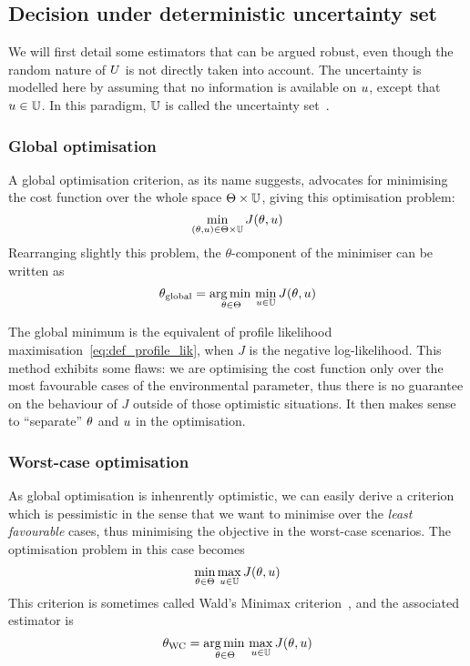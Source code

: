 \documentclass[../../Main_ManuscritThese.tex]{subfiles}
\begin{document}
\subsection{Decision under deterministic uncertainty set}
We will first detail some estimators that can be argued robust, even though the random nature of $U$ is not directly taken into account.
The uncertainty is modelled here by assuming that no information is available on $u$, except that $u \in \mathbb{U}$. In this paradigm, $\mathbb{U}$ is called the uncertainty set~\citep{bertsimas_theory_2010}.

\subsubsection{Global optimisation}
A global optimisation criterion, as its name suggests, advocates for minimising the cost function over the whole space $\Theta \times \mathbb{U}$, giving this optimisation problem:
\begin{equation}
  \min_{(\theta,u) \in \Theta \times \mathbb{U}} J(\theta, u)
\end{equation}
Rearranging slightly this problem, the $\theta$-component of the minimiser can be written as
\begin{equation}
  \label{eq:kkglobal}
  {\theta}_{\mathrm{global}} = \operatorname*{arg\,min \,}_{\theta \in \Theta} \min_{u \in \mathbb{U}} J(\theta, u)
\end{equation}

The global minimum is the equivalent of profile likelihood
maximisation~\cref{eq:def_profile_lik}, when $J$ is the negative
log-likelihood. This method exhibits some flaws: we are optimising the
cost function only over the most favourable cases of the environmental
parameter, thus there is no guarantee on the behaviour of $J$ outside
of those optimistic situations.  It then makes sense to ``separate''
$\theta$ and $u$ in the optimisation.

\subsubsection{Worst-case optimisation}
\label{sec:saddle_point}
As global optimisation is inhenrently optimistic, we can easily derive
a criterion which is pessimistic in the sense that we want to minimise
over the \emph{least favourable} cases, thus minimising the objective
in the worst-case scenarios. The optimisation problem in this case
becomes
\begin{equation}
  \min_{\theta\in\Theta} \max_{u \in \mathbb{U}} J(\theta,u)
\end{equation}
This criterion is sometimes called Wald's Minimax criterion~\citep{wald_statistical_1945}, and the associated estimator is
\begin{equation}
  \label{eq:kkwc}
  {\theta}_{\mathrm{WC}} =  \operatorname*{arg\,min \,}_{\theta \in \Theta} \max_{u \in \mathbb{U}} J(\theta, u)
\end{equation}
\end{document}
